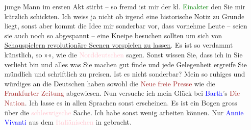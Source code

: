                junge Mann im ersten Akt stirbt – so fremd ist mir der kl. \textcolor{green}{Einakter}{} den Sie mir kürzlich schickten. Ich
               weiss ja nicht ob irgend eine historische Notiz zu Grunde liegt, sonst aber kommt die
               Idee mir sonderbar vor, dass vornehme Leute – seien sie auch noch so abgespannt –
               eine Kneipe besuchen sollten um sich von \uline{Schauspielern
                  revolutionäre Scenen vorspielen zu lassen}. Es ist so verdammt künstlich, so
                  »\label{K_L00905_1v}\label{K_L00905_1h}«, wie die \textcolor{pink}{Norddeutschen}{}\ledrightnote{\textcolor{pink}{Deutschland}}
               sagen.\pend
           \pstart
           Sonst wissen Sie, dass ich in Sie verliebt bin und alles was Sie machen {\pb}gut finde und jede Gelegenheit
               ergreife Sie mündlich und schriftlich zu preisen.\pend
           \pstart
           Ist es nicht sonderbar? Mein so ruhiges und würdiges \label{K_L00905_2v}\label{K_L00905_2h} an die Deutschen haben sowohl die \textcolor{brown}{Neue freie
                  Presse}{}\ledrightnote{\textcolor{brown}{Neue Freie Presse}} wie die \textcolor{brown}{Frankfurter Zeitung}{}\ledrightnote{\textcolor{brown}{Frankfurter Zeitung}}
               abgewiesen. Nun versuche ich mein Glück bei \textcolor{blue}{Barth}{}\ledrightnote{\textcolor{blue}{Theodor Barth}}’s \textcolor{brown}{Die Nation}{}\ledrightnote{\textcolor{brown}{Die Nation}}. Ich lasse es in allen
               Sprachen sonst erscheinen. Es ist ein Bogen gross über die \textcolor{pink}{schleswigsche}{}\ledrightnote{\textcolor{pink}{Südschleswig}} Sache.\pend
           \pstart
           Ich habe sonst wenig arbeiten können. Nur \textcolor{blue}{Annie
                  Vivanti}{}\ledrightnote{\textcolor{blue}{Annie Vivanti}} aus dem \textcolor{pink}{Italiänischen}{}\ledrightnote{\textcolor{pink}{Italien}} in \label{K_L00905_3v}\label{K_L00905_3h} gebracht.\pend
